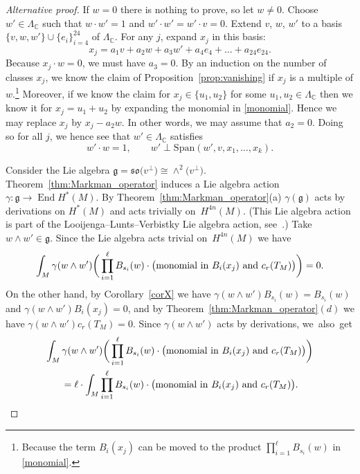 \documentclass[pdftex]{sigma}
\numberwithin{equation}{section}
\newcommand{\BC}{{\mathbb{C}}}
\newcommand{\Fg}{{\mathfrak{g}}}
\newcommand\End{\operatorname{End}}
\newcommand{\1}{\mathsf{1}}
\begin{document}
\begin{proof}[Alternative proof]
If $w=0$ there is nothing to prove, so let $w \neq 0$.
Choose $w' \in \Lambda_{\BC}$ such that $w \cdot w'=1$ and $w' \cdot w' = w' \cdot v = 0$.
Extend $v$, $w$, $w'$ to a basis $\{ v, w, w' \} \cup \{ e_i \}_{i=4}^{24}$ of $\Lambda_{\BC}$.
For any $j$, expand $x_j$ in this basis:
\[
x_j = a_1 v + a_2 w + a_3 w' + a_4 e_4 + \dots + a_{24} e_{24}.
\]
Because $x_j \cdot w=0$, we must have $a_3=0$.
By an induction on the number of classes $x_j$,
we know the claim of Proposition~\ref{prop:vanishing} if $x_j$ is a multiple of $w$.\footnote{Because
the term $B_i(x_j)$ can be moved to the product $\prod_{i=1}^{\ell} B_{s_i}(w)$ in \eqref{monomial}.}
Moreover, if we know the claim for $x_j \in \{ u_1, u_2 \}$ for some $u_1, u_2 \in \Lambda_{\BC}$ then we know it for $x_j = u_1 + u_2$
by expanding the monomial in \eqref{monomial}.
Hence we may replace $x_j$ by $x_j - a_2 w$. In other words, we may assume that $a_2=0$.
Doing so for all $j$, we hence see that
$w' \in \Lambda_{\BC}$ satisfies
\[
w' \cdot w = 1, \qquad w' \perp \mathrm{Span}(w', v, x_1, \dots, x_k).
\]

Consider the Lie algebra $\Fg = \mathfrak{so}\big(v^{\perp}\big) \cong \wedge^2 \big(v^{\perp}\big)$.
Theorem~\ref{thm:Markman_operator} induces a Lie algebra action $\gamma \colon \Fg \to \End H^{\ast}(M)$.
By Theorem~\ref{thm:Markman_operator}(a) $\gamma(\Fg)$ acts by derivations on $H^{\ast}(M)$
and acts trivially on~$H^{4n}(M)$.
(This Lie algebra action is part of the Looijenga--Lunts--Verbistky Lie algebra action, see~\cite[Lemma 4.13]{Markman}.)
Take $w \wedge w' \in \Fg$. Since the Lie algebra acts trivial on~$H^{4n}(M)$ we have
\begin{equation*}
\int_{M} \gamma(w \wedge w') \bigg( \prod_{i=1}^{\ell} B_{s_i}(w) \cdot \big( \textup{monomial in } B_i(x_j) \textup{ and } c_r(T_M) \big) \bigg) = 0.
\end{equation*}
On the other hand, by Corollary~\ref{corX} we have
$\gamma(w \wedge w') B_{s_i}(w) = B_{s_i}(w)$ and $\gamma(w \wedge w') B_i(x_j) = 0$,
and by Theorem~\ref{thm:Markman_operator}$(d)$ we have $\gamma(w \wedge w') c_r(T_{M}) = 0$.
Since $\gamma(w \wedge w')$ acts by derivations, we~also~get\pagebreak
\begin{gather*}
\int_{M} \gamma(w \wedge w') \bigg( \prod_{i=1}^{\ell} B_{s_i}(w) \cdot \big( \textup{monomial in } B_i(x_j) \textup{ and } c_r(T_M) \big) \bigg)
\\ \qquad
{}= \ell \cdot \int_{M} \prod_{i=1}^{\ell} B_{s_i}(w) \cdot \big( \textup{monomial in } B_i(x_j) \textup{ and } c_r(T_M) \big). \tag*{\qed}
\end{gather*}
\renewcommand{\qed}{}
\end{proof}
\end{document}
